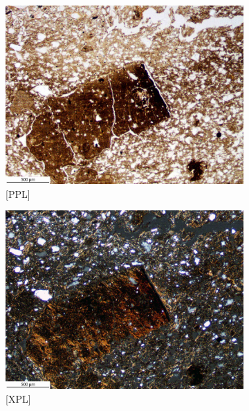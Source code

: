 \documentclass[a4paper]{article}
\begin{document}
\begin{figure}[H]
	\centering
	\begin{subfigure}[t]{.49\textwidth}
		\includegraphics[width=\textwidth]{ThinSections/45-1_4x_PPL.jpg}
		\caption{[PPL]}
	\end{subfigure}\hspace{.5em}\hfill
	\begin{subfigure}[t]{.49\textwidth}
		\includegraphics[width=\textwidth]{ThinSections/45-1_4x_XPL.jpg}
		\caption{[XPL]}
	\end{subfigure}
	\begin{subfigure}[t]{.49\textwidth}

\end{subfigure}
\end{figure}
\end{document}
